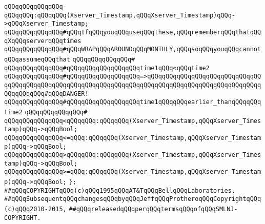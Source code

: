 \verb|qQQqqQQqqQQqqQQq-qQQqqQQq:qQQqqQQq(Xserver_Timestamp,qQQqXserver_Timestamp)qQQq->qQQqXserver_Timestamp;|\newline
\newline
\verb|qQQqqQQqqQQqqQQq#qQQqIfqQQqyouqQQquseqQQqthese,qQQqrememberqQQqthatqQQqXqQQqserverqQQqtimes|\newline
\verb|qQQqqQQqqQQqqQQq#qQQqWRAPqQQqAROUNDqQQqMONTHLY,qQQqsoqQQqyouqQQqcannotqQQqassumeqQQqthat|\newline
\verb|qQQqqQQqqQQqqQQq#|\newline
\verb|qQQqqQQqqQQqqQQq#qQQqqQQqqQQqqQQqqQQqtime1qQQq<qQQqtime2|\newline
\verb|qQQqqQQqqQQqqQQq#qQQqqQQqqQQqqQQqqQQq=>qQQqqQQqqQQqqQQqqQQqqQQqqQQqqQQqqQQqqQQqqQQqqQQqqQQqqQQqqQQqqQQqqQQqqQQqqQQqqQQqqQQqqQQqqQQqqQQqqQQqqQQqqQQqqQQq#qQQqDANGER!|\newline
\verb|qQQqqQQqqQQqqQQq#qQQqqQQqqQQqqQQqqQQqtime1qQQqqQQqearlier_thanqQQqqQQqtime2|\newline
\verb|qQQqqQQqqQQqqQQq#|\newline
\verb|qQQqqQQqqQQqqQQq<qQQqqQQq:qQQqqQQq(Xserver_Timestamp,qQQqXserver_Timestamp)qQQq->qQQqBool;|\newline
\verb|qQQqqQQqqQQqqQQq<=qQQq:qQQqqQQq(Xserver_Timestamp,qQQqXserver_Timestamp)qQQq->qQQqBool;|\newline
\verb|qQQqqQQqqQQqqQQq>qQQqqQQq:qQQqqQQq(Xserver_Timestamp,qQQqXserver_Timestamp)qQQq->qQQqBool;|\newline
\verb|qQQqqQQqqQQqqQQq>=qQQq:qQQqqQQq(Xserver_Timestamp,qQQqXserver_Timestamp)qQQq->qQQqBool;|\newline
\verb|};|\newline
\newline
\newline
\verb|##qQQqCOPYRIGHTqQQq(c)qQQq1995qQQqAT&TqQQqBellqQQqLaboratories.|\newline
\verb|##qQQqSubsequentqQQqchangesqQQqbyqQQqJeffqQQqProtheroqQQqCopyrightqQQq(c)qQQq2010-2015,|\newline
\verb|##qQQqreleasedqQQqperqQQqtermsqQQqofqQQqSMLNJ-COPYRIGHT.|\newline

